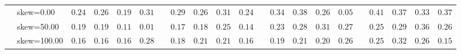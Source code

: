 \begin{table}[!tbp]
\begin{center}
\begin{tabular}{lrrrrcrrrrcrrrrcrrrr}
   ~~skew=0.00&\cellcolor[gray]{0.47}   $0.24$&\cellcolor[gray]{0.47}   $0.26$&\cellcolor[gray]{0.73}   $0.19$&\cellcolor[gray]{0.2}   $0.31$&   &\cellcolor[gray]{0.47}   $0.29$&\cellcolor[gray]{0.47}   $0.26$&\cellcolor[gray]{0.47}   $0.31$&\cellcolor[gray]{0.47}   $0.24$&   &\cellcolor[gray]{0.2}   $0.34$&\cellcolor[gray]{0.2}   $0.38$&\cellcolor[gray]{0.47}   $ 0.26$&\cellcolor[gray]{1}   $ 0.05$&   &\cellcolor[gray]{0.2}   $0.41$&\cellcolor[gray]{0.2}   $0.37$&\cellcolor[gray]{0.2}   $ 0.33$&\cellcolor[gray]{0.2}   $ 0.37$\tabularnewline
   ~~skew=50.00&\cellcolor[gray]{0.73}   $0.19$&\cellcolor[gray]{0.73}   $0.19$&\cellcolor[gray]{1}   $0.11$&\cellcolor[gray]{1}   $0.01$&   &\cellcolor[gray]{0.73}   $0.17$&\cellcolor[gray]{0.73}   $0.18$&\cellcolor[gray]{0.47}   $0.25$&\cellcolor[gray]{0.73}   $0.14$&   &\cellcolor[gray]{0.47}   $0.23$&\cellcolor[gray]{0.47}   $0.28$&\cellcolor[gray]{0.47}   $ 0.31$&\cellcolor[gray]{0.47}   $ 0.27$&   &\cellcolor[gray]{0.47}   $0.25$&\cellcolor[gray]{0.47}   $0.29$&\cellcolor[gray]{0.2}   $ 0.36$&\cellcolor[gray]{0.47}   $ 0.26$\tabularnewline
   ~~skew=100.00&\cellcolor[gray]{0.73}   $0.16$&\cellcolor[gray]{0.73}   $0.16$&\cellcolor[gray]{0.73}   $0.16$&\cellcolor[gray]{0.47}   $0.28$&   &\cellcolor[gray]{0.73}   $0.18$&\cellcolor[gray]{0.47}   $0.21$&\cellcolor[gray]{0.73}   $0.21$&\cellcolor[gray]{0.73}   $0.16$&   &\cellcolor[gray]{0.73}   $0.19$&\cellcolor[gray]{0.47}   $0.21$&\cellcolor[gray]{0.73}   $ 0.20$&\cellcolor[gray]{0.47}   $ 0.26$&   &\cellcolor[gray]{0.47}   $0.25$&\cellcolor[gray]{0.2}   $0.32$&\cellcolor[gray]{0.47}   $ 0.26$&\cellcolor[gray]{0.73}   $ 0.15$\tabularnewline
\hline
\end{tabular}\end{center}

\end{table}
